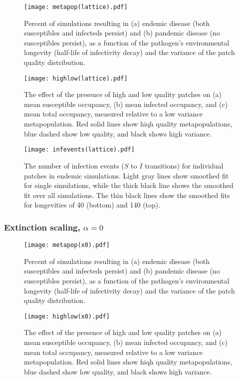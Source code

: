 \documentclass{svjour3}
\begin{document}
\begin{figure}[h!]
\centering
\texttt{[image: metapop(lattice).pdf]}
\caption{Percent of simulations resulting in (a) endemic disease (both susceptibles and infecteds persist) and (b) pandemic disease (no susceptibles persist), as a function of the pathogen's environmental longevity (half-life of infectivity decay) and the variance of the patch quality distribution.}
\label{poutcome_lattice}
\end{figure}   

\begin{figure}
\centering
\texttt{[image: highlow(lattice).pdf]}
\caption{The effect of the presence of high and low quality patches on (a) mean susceptible occupancy, (b) mean infected occupancy, and (c) mean total occupancy, measured relative to  a low variance metapopulation.  Red solid lines show hiqh quality metapopulations, blue dashed show low quality, and black shows high variance.}
\label{sens_lattice}
\end{figure}

\begin{figure}
\centering
\texttt{[image: infevents(lattice).pdf]}
\caption{The number of infection events ($S$ to $I$ transitions) for individual patches in endemic simulations.  Light gray lines show smoothed fit for single simulations, while the thick black line shows the smoothed fit over all simulations.  The thin black lines show the smoothed fits for longevities of 40 (bottom) and 140 (top).}
\label{infections_lattice}
\end{figure}

\clearpage

\subsubsection{Extinction scaling, $\alpha = 0$}

\begin{figure}[h!]
\centering
\texttt{[image: metapop(x0).pdf]}
\caption{Percent of simulations resulting in (a) endemic disease (both susceptibles and infecteds persist) and (b) pandemic disease (no susceptibles persist), as a function of the pathogen's environmental longevity (half-life of infectivity decay) and the variance of the patch quality distribution.}
\label{poutcome_x0}
\end{figure}   

\begin{figure}
\centering
\texttt{[image: highlow(x0).pdf]}
\caption{The effect of the presence of high and low quality patches on (a) mean susceptible occupancy, (b) mean infected occupancy, and (c) mean total occupancy, measured relative to  a low variance metapopulation.  Red solid lines show hiqh quality metapopulations, blue dashed show low quality, and black shows high variance.}
\label{sens_x0}
\end{figure}
\end{document}
